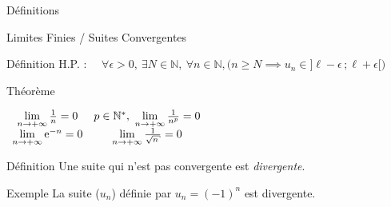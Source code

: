 \documentclass{coursbook}
\begin{document}
\begin{Gpartie}{Définitions}
\begin{Spartie}{Limites Finies / Suites Convergentes}
\begin{SSpartie}{Définition}
                H.P. : $\quad\forall\epsilon >0,~\exists N\in\mathbb{N},~\forall n\in\mathbb{N}, \Big(n\geq N\implies u_n\in\big]\ell-\epsilon\,; \ell+\epsilon\big[\Big)$
            \end{SSpartie}
            \begin{SSpartie}{Théorème} 
                \begin{center}$\begin{array}{cc}
                    \lim\limits_{n\to +\infty}\frac{1}{n}=0 & p\in\mathbb{N^*},\ \lim\limits_{n\to +\infty}\frac{1}{n^p}=0 \\
                    \lim\limits_{n\to +\infty}\me^{-n}=0 & \lim\limits_{n\to +\infty}\frac{1}{\sqrt{n}}=0
                \end{array}$\end{center}
            \end{SSpartie}
            \begin{SSpartie}{Définition} 
                Une suite qui n'est pas convergente est \emph{divergente}.
            \end{SSpartie}
            \begin{SSpartie}{Exemple} 
                La suite ($u_n$) définie par $u_n=(-1)^n$ est divergente.
            \end{SSpartie}
        \end{Spartie}
    \end{Gpartie}
    \pagebreak
\end{document}
